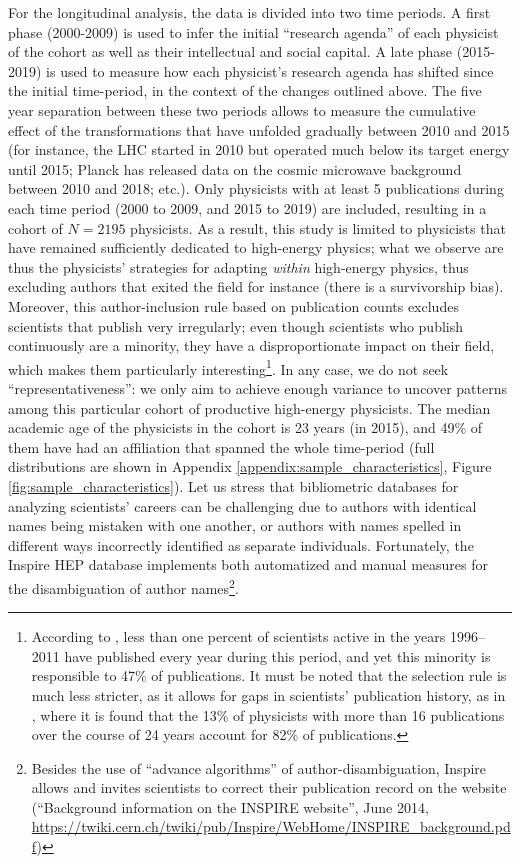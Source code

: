 \documentclass{article}
\begin{document}
For the longitudinal analysis, the data is divided into two time periods. A first phase (2000-2009) is used to infer the initial ``research agenda'' of each physicist of the cohort as well as their intellectual and social capital. A late phase (2015-2019) is used to measure how each physicist's research agenda has shifted since the initial time-period, in the context of the changes outlined above. The five year separation between these two periods allows to measure the cumulative effect of the transformations that have unfolded gradually between 2010 and 2015 (for instance, the LHC started in 2010 but operated much below its target energy until 2015; Planck has released data on the cosmic microwave background between 2010 and 2018; etc.). Only physicists with at least 5 publications during each time period (2000 to 2009, and 2015 to 2019) are included, resulting in a cohort of $N=2195$ physicists. As a result, this study is limited to physicists that have remained sufficiently dedicated to high-energy physics; what we observe are thus the physicists' strategies for adapting \textit{within} high-energy physics, thus excluding authors that exited the field for instance (there is a survivorship bias). Moreover, this author-inclusion rule based on publication counts excludes scientists that publish very irregularly; even though scientists who publish continuously are a minority, they have a disproportionate impact on their field, which makes them particularly interesting\footnote{According to  \citet{Ioannidis2014}, less than one percent of scientists active in the years 1996–2011 have published every year during this period, and yet this minority is responsible to 47\% of publications. It must be noted that the selection rule is much less stricter, as it allows for gaps in scientists' publication history, as in \citealt{Feifan2023}, where it is found that the 13\% of physicists with more than 16 publications over the course of 24 years account for 82\% of publications.}. In any case, we do not seek ``representativeness'': we only aim to achieve enough variance to uncover patterns among this particular cohort of productive high-energy physicists. The median academic age of the physicists in the cohort is 23 years (in 2015), and 49\% of them have had an affiliation that spanned the whole time-period (full distributions are shown in Appendix \ref{appendix:sample_characteristics}, Figure \ref{fig:sample_characteristics}). Let us stress that bibliometric databases for analyzing scientists' careers can be challenging due to authors with identical names being mistaken with one another, or authors with names spelled in different ways incorrectly identified as separate individuals. Fortunately, the Inspire HEP database implements both automatized and manual measures for the disambiguation of author names\footnote{Besides the use of ``advance algorithms'' of author-disambiguation, Inspire allows and invites scientists to correct their publication record on the website (``Background	information	on	the	INSPIRE	website'', June 2014, \url{https://twiki.cern.ch/twiki/pub/Inspire/WebHome/INSPIRE_background.pdf})}. %
\end{document}
